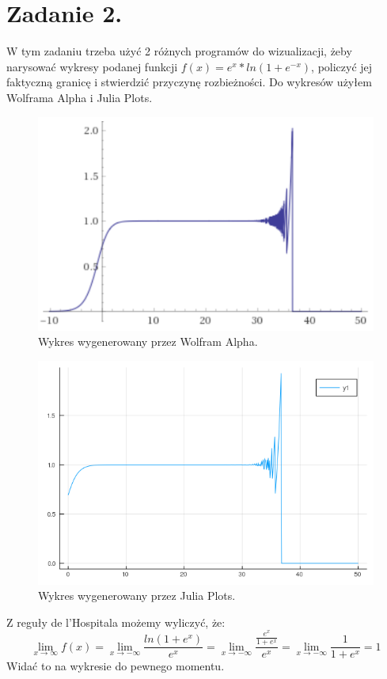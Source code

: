 \documentclass{article}
\begin{document}
\section{Zadanie 2.}
W tym zadaniu trzeba użyć 2 różnych programów do wizualizacji, żeby narysować wykresy podanej funkcji $f(x) = e^x*ln(1+ e^{-x})$, policzyć jej faktyczną granicę i stwierdzić przyczynę rozbieżności. Do wykresów użyłem Wolframa Alpha i Julia Plots.
\begin{figure}[H]
	\includegraphics[width=\linewidth]{wolfram-wykres.png}
	\caption{Wykres wygenerowany przez Wolfram Alpha.}
	\label{fig:wolfram}
\end{figure}
\begin{figure}[H]
	\includegraphics[width=\linewidth]{wykres.png}
	\caption{Wykres wygenerowany przez Julia Plots.}
	\label{fig:julia}
\end{figure}
Z reguły de l'Hospitala możemy wyliczyć, że:
\[ \lim_{x \to \infty} f(x) = \lim_{x \to -\infty} \frac{ln(1+e^x)}{e^x} = \lim_{x \to -\infty} \frac{\frac{e^x}{1+e^x}}{e^x} = \lim_{x \to -\infty} \frac{1}{1+e^x} = 1 \]
\newline
Widać to na wykresie do pewnego momentu.
\end{document}
